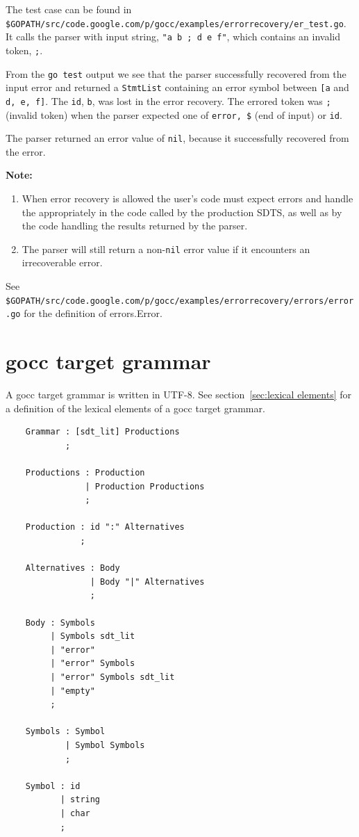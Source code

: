 \documentclass[12pt]{article}
\begin{document}
	The test case can be found in \\
	\verb|$GOPATH/src/code.google.com/p/gocc/examples/errorrecovery/er_test.go|. \\
	It calls the parser with input string, \verb|"a b ; d e f"|, which contains an invalid token, \verb|;|.

	From the \verb|go test| output we see that the parser successfully recovered from the input error and returned a \verb|StmtList| containing an error symbol between \verb|[a| and \verb|d, e, f]|. The \verb|id|, \verb|b|, was lost in the error recovery. The errored token was \verb|;| (invalid token) when the parser expected one of \verb|error, $| (end of input) or \verb|id|.

	The parser returned an error value of \verb|nil|, because it successfully recovered from the error.

	{\bf Note:} \\
	\begin{enumerate}
		\item When error recovery is allowed the user's code must expect errors and handle the appropriately in the code called by the production SDTS, as well as by the code handling the results returned by the parser.

		\item The parser will still return a non-\verb|nil| error value if it encounters an irrecoverable error.
	\end{enumerate}

	See \verb|$GOPATH/src/code.google.com/p/gocc/examples/errorrecovery/errors/error.go| for the definition of errors.Error.

\appendix
\section{gocc target grammar}\label{sec:gocc bnf}
	A gocc target grammar is written in UTF-8. See section~\ref{sec:lexical elements} for a definition of the lexical elements of a gocc target grammar. 

	\begin{verbatim}
	Grammar : [sdt_lit] Productions 
	        ;

	Productions : Production					
	            | Production Productions			
	            ;

	Production : id ":" Alternatives		
	           ;

	Alternatives : Body					
	             | Body "|" Alternatives	
	             ; 

	Body : Symbols					
	     | Symbols sdt_lit			
	     | "error"
	     | "error" Symbols
	     | "error" Symbols sdt_lit
	     | "empty"
	     ;

	Symbols	: Symbol					
	        | Symbol Symbols			
	        ;

	Symbol : id							
	       | string						
	       | char	
	       ;
	\end{verbatim}
\end{document}
